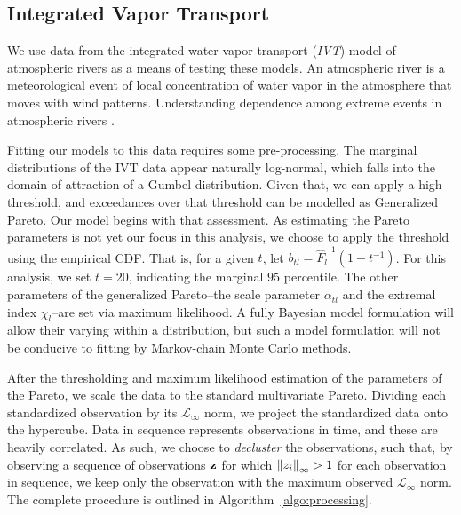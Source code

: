 \subsection{Integrated Vapor Transport}
We use data from the integrated water vapor transport (\emph{IVT}) model
  of atmospheric rivers as a means of testing these models.  An atmospheric river is a meteorological
  event of local concentration of water vapor in the atmosphere that moves with wind patterns.
  Understanding dependence among extreme events in atmospheric rivers .

Fitting our models to this data requires some pre-processing.  The marginal distributions of the
  IVT data appear naturally log-normal, which falls into the domain of attraction of a Gumbel
  distribution.  Given that, we can apply a high threshold, and exceedances over that threshold can
  be modelled as Generalized Pareto.  Our model begins with that assessment.  As estimating
  the Pareto parameters is not yet our focus in this analysis, we choose to apply the threshold
  using the empirical CDF.  That is, for a given $t$, let $b_{tl} = \hat{F}_l^{-1}(1 - t^{-1})$.  For
  this analysis, we set $t = 20$, indicating the marginal $95$ percentile.  The other parameters of the
  generalized Pareto--the scale parameter $\alpha_{tl}$ and the extremal index $\chi_l$--are set via
  maximum likelihood.  A fully Bayesian model formulation will allow their varying within a
  distribution, but such a model formulation will not be conducive to fitting by Markov-chain Monte
  Carlo methods.

After the thresholding and maximum likelihood estimation of the parameters of the Pareto, we scale
  the data to the standard multivariate Pareto.  Dividing each standardized observation by its
  $\mathcal{L}_{\infty}$ norm, we project the standardized data onto the hypercube.  Data in sequence
  represents observations in time, and these are heavily correlated.  As such, we choose to
  \emph{decluster} the observations, such that, by observing a sequence of observations ${\bf z}$
  for which $\left\lVert z_i \right\rVert_{\infty} > 1$ for each observation in sequence, we keep only the observation with
  the maximum observed $\mathcal{L}_{\infty}$ norm.  The complete procedure is outlined in
  Algorithm~\ref{algo:processing}.

